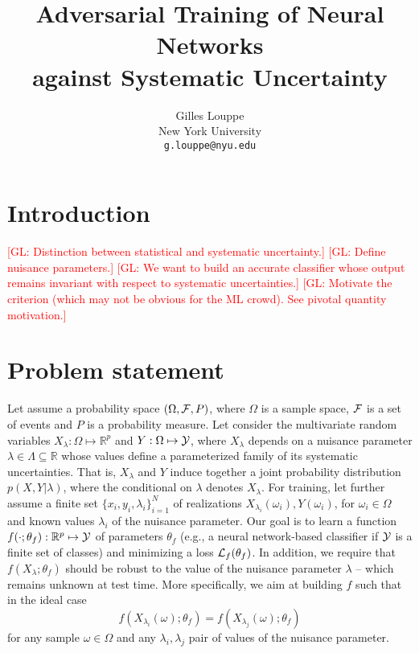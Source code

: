\documentclass{article}
\title{Adversarial Training of Neural Networks\\
against Systematic Uncertainty}
\author{
  Gilles Louppe \\
  New York University\\
  \texttt{g.louppe@nyu.edu} \\
}
\newcommand{\glnote}[1]{\textcolor{red}{[GL: #1]}}
\theoremstyle{plain}
\begin{document}

\maketitle

\begin{abstract}
\end{abstract}

\section{Introduction}

\glnote{Distinction between statistical and systematic uncertainty.}
\glnote{Define nuisance parameters.}
\glnote{We want to build an accurate classifier whose output remains invariant with
respect to systematic uncertainties.}
\glnote{Motivate the criterion (which may not be obvious for the ML crowd). See pivotal quantity motivation.}



\section{Problem statement}
\label{sec:problem}

Let assume a probability space $(\Omega, {\cal F}, P)$, where $\Omega$ is a
sample space, ${\cal F}$ is a set of events and $P$ is a probability measure.
Let consider the multivariate random variables $X_\lambda: \Omega \mapsto
\mathbb{R}^p$ and $Y: \Omega \mapsto {\cal Y}$, where $X_\lambda$ depends on a
nuisance parameter $\lambda \in \Lambda \subseteq \mathbb{R}$ whose values define a
parameterized family of its systematic uncertainties. That is, $X_\lambda$ and
$Y$ induce together a joint probability distribution $p(X,Y|\lambda)$, where the
conditional on $\lambda$ denotes $X_\lambda$. For training, let further assume a
finite set $\{ x_i, y_i, \lambda_i \}_{i=1}^N$ of realizations
$X_{\lambda_i}(\omega_i), Y(\omega_i)$, for $\omega_i \in \Omega$ and known
values $\lambda_i$ of the nuisance parameter. Our goal is to learn a function
$f(\cdot;\theta_f) : \mathbb{R}^p \mapsto {\cal Y}$ of parameters $\theta_f$
(e.g., a neural network-based classifier if ${\cal Y}$ is a finite set of
classes) and minimizing  a loss ${\cal L}_f(\theta_f)$. In addition, we require
that $f(X_\lambda ; \theta_f)$ should be robust to the value of the nuisance parameter $\lambda$ --
which remains unknown at test time. More specifically, we aim at building $f$
such that in the ideal case
\begin{equation}\label{eqn:criterion-true}
f(X_{\lambda_i}(\omega) ; \theta_f) = f(X_{\lambda_j}(\omega) ; \theta_f)
\end{equation} for any
sample $\omega \in \Omega$ and any $\lambda_i, \lambda_j$ pair of values of the
nuisance parameter.
\end{document}
